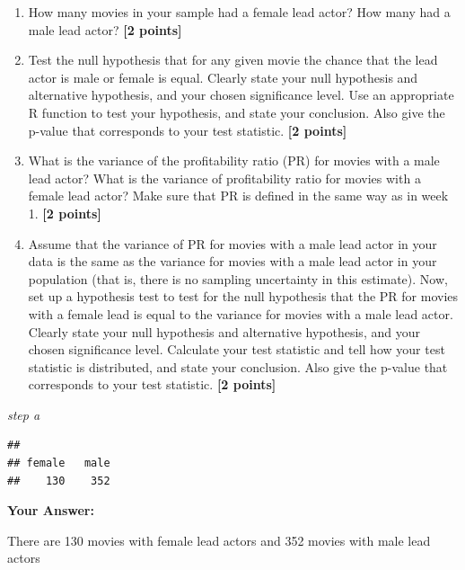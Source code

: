 \documentclass[
]{article}
\newenvironment{Shaded}{\begin{snugshade}}{\end{snugshade}}
\newcommand{\FunctionTok}[1]{\textcolor[rgb]{0.13,0.29,0.53}{\textbf{#1}}}
\newcommand{\NormalTok}[1]{#1}
\newcommand{\SpecialCharTok}[1]{\textcolor[rgb]{0.81,0.36,0.00}{\textbf{#1}}}
\providecommand{\tightlist}{%
  \setlength{\itemsep}{0pt}\setlength{\parskip}{0pt}}
\begin{document}
\begin{enumerate}
\def\labelenumi{\alph{enumi}.}
\tightlist
\item
  How many movies in your sample had a female lead actor? How many had a
  male lead actor? \textbf{[2 points]}
\item
  Test the null hypothesis that for any given movie the chance that the
  lead actor is male or female is equal. Clearly state your null
  hypothesis and alternative hypothesis, and your chosen significance
  level. Use an appropriate R function to test your hypothesis, and
  state your conclusion. Also give the p-value that corresponds to your
  test statistic. \textbf{[2 points]}
\item
  What is the variance of the profitability ratio (PR) for movies with a
  male lead actor? What is the variance of profitability ratio for
  movies with a female lead actor? Make sure that PR is defined in the
  same way as in week 1. \textbf{[2 points]}
\item
  Assume that the variance of PR for movies with a male lead actor in
  your data is the same as the variance for movies with a male lead
  actor in your population (that is, there is no sampling uncertainty in
  this estimate). Now, set up a hypothesis test to test for the null
  hypothesis that the PR for movies with a female lead is equal to the
  variance for movies with a male lead actor. Clearly state your null
  hypothesis and alternative hypothesis, and your chosen significance
  level. Calculate your test statistic and tell how your test statistic
  is distributed, and state your conclusion. Also give the p-value that
  corresponds to your test statistic. \textbf{[2 points]}
\end{enumerate}

\emph{step a}

\begin{Shaded}
\end{Shaded}

\begin{verbatim}
## 
## female   male 
##    130    352
\end{verbatim}

\textbf{Your Answer:}

There are 130 movies with female lead actors and 352 movies with male
lead actors
\end{document}

